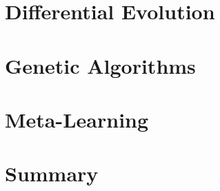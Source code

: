 
\section{Differential Evolution}
\label{sec:heuristics:de}






\section{Genetic Algorithms}
\label{sec:heuristics:ga}






\section{Meta-Learning}
\label{sec:heuristics:meta-learning}











\section{Summary}
\label{sec:heuristics:summary}












